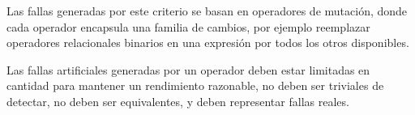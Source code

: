 Las fallas generadas por este criterio se basan en operadores de mutaci\'on, donde cada operador encapsula una familia de cambios, por ejemplo reemplazar operadores relacionales binarios en una expresi\'on por todos los otros disponibles.

Las fallas artificiales generadas por un operador deben estar limitadas en cantidad para mantener un rendimiento razonable, no deben ser triviales de detectar, no deben ser equivalentes, y deben representar fallas reales.




